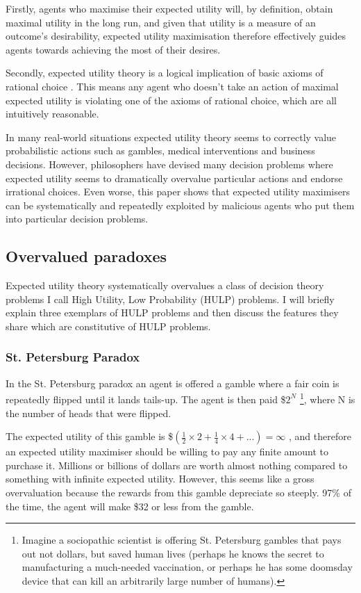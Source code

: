 \documentclass{article}
\begin{document}
Firstly, agents who maximise their expected utility will, by definition, obtain maximal utility in the long run, and given that utility is a measure of an outcome's desirability, expected utility maximisation therefore effectively guides agents towards achieving the most of their desires.

Secondly, expected utility theory is a logical implication of basic axioms of rational choice \citep{von1944games}. This means any agent who doesn't take an action of maximal expected utility is violating one of the axioms of rational choice, which are all intuitively reasonable.

In many real-world situations expected utility theory seems to correctly value probabilistic actions such as gambles, medical interventions and business decisions. However, philosophers have devised many decision problems where expected utility seems to dramatically overvalue particular actions and endorse irrational choices. Even worse, this paper shows that expected utility maximisers can be systematically and repeatedly exploited by malicious agents who put them into particular decision problems. 

\subsection {Overvalued paradoxes}

Expected utility theory systematically overvalues a class of decision theory problems I call High Utility, Low Probability (HULP) problems. I will briefly explain three exemplars of HULP problems and then discuss the features they share which are constitutive of HULP problems.

\subsubsection {St. Petersburg Paradox}

In the St. Petersburg paradox an agent is offered a gamble where a fair coin is repeatedly flipped until it lands tails-up. The agent is then paid \$\(2^N\) \footnote{Imagine a sociopathic scientist is offering St. Petersburg gambles that pays out not dollars, but saved human lives (perhaps he knows the secret to manufacturing a much-needed vaccination, or perhaps he has some doomsday device that can kill an arbitrarily large number of humans).}, where N is the number of heads that were flipped. 

The expected utility of this gamble is \$\((\frac{1}{2}\times2 + \frac{1}{4}\times4+...) = \infty\) \citep{resnik1987choices}, and therefore an expected utility maximiser should be willing to pay any finite amount to purchase it. Millions or billions of dollars are worth almost nothing compared to something with infinite expected utility. However, this seems like a gross overvaluation because the rewards from this gamble depreciate so steeply. 97\% of the time, the agent will make \$32 or less from the gamble. 
\end{document}
